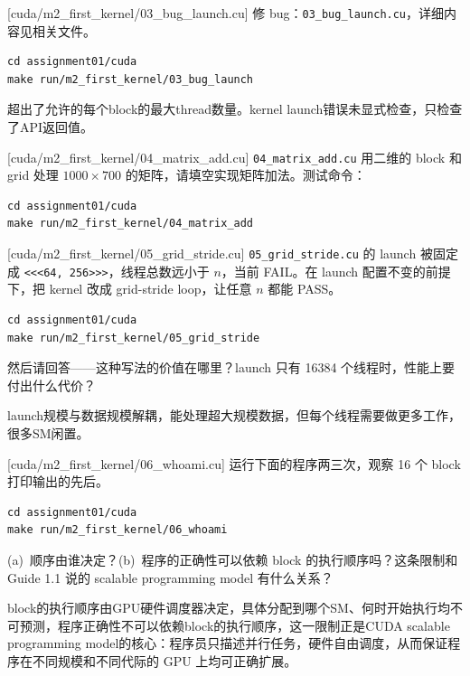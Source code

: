 \documentclass[11pt,a4paper,fontset=none]{ctexart}
\begin{document}
[cuda/m2\_first\_kernel/03\_bug\_launch.cu]
修 bug：\texttt{03\_bug\_launch.cu}，详细内容见相关文件。

\begin{lstlisting}
cd assignment01/cuda
make run/m2_first_kernel/03_bug_launch
\end{lstlisting}

超出了允许的每个block的最大thread数量。kernel launch错误未显式检查，只检查了API返回值。

[cuda/m2\_first\_kernel/04\_matrix\_add.cu]
\texttt{04\_matrix\_add.cu} 用二维的 block 和 grid 处理 $1000 \times 700$ 的矩阵，请填空实现矩阵加法。测试命令：

\begin{lstlisting}
cd assignment01/cuda
make run/m2_first_kernel/04_matrix_add
\end{lstlisting}

[cuda/m2\_first\_kernel/05\_grid\_stride.cu]
\texttt{05\_grid\_stride.cu} 的 launch 被固定成 \texttt{<<<64, 256>>>}，线程总数远小于 $n$，当前 FAIL。在 launch 配置不变的前提下，把 kernel 改成 grid-stride loop，让任意 $n$ 都能 PASS。

\begin{lstlisting}
cd assignment01/cuda
make run/m2_first_kernel/05_grid_stride
\end{lstlisting}

然后请回答——这种写法的价值在哪里？launch 只有 16384 个线程时，性能上要付出什么代价？

launch规模与数据规模解耦，能处理超大规模数据，但每个线程需要做更多工作，很多SM闲置。

[cuda/m2\_first\_kernel/06\_whoami.cu]
运行下面的程序两三次，观察 16 个 block 打印输出的先后。

\begin{lstlisting}
cd assignment01/cuda
make run/m2_first_kernel/06_whoami
\end{lstlisting}

(a)~顺序由谁决定？(b)~程序的正确性可以依赖 block 的执行顺序吗？这条限制和 Guide 1.1 说的 scalable programming model 有什么关系？

block的执行顺序由GPU硬件调度器决定，具体分配到哪个SM、何时开始执行均不可预测，程序正确性不可以依赖block的执行顺序，这一限制正是CUDA scalable programming model的核心：程序员只描述并行任务，硬件自由调度，从而保证程序在不同规模和不同代际的 GPU 上均可正确扩展。
\end{document}
